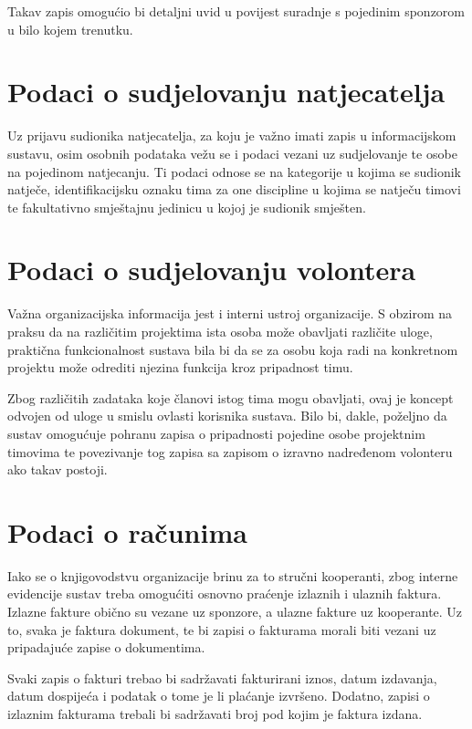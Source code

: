 \documentclass[times, utf8, diplomski]{fer}
\begin{document}
Takav zapis omogućio bi detaljni uvid u povijest suradnje s pojedinim sponzorom
u bilo kojem trenutku.

\section{Podaci o sudjelovanju natjecatelja}

Uz prijavu sudionika natjecatelja, za koju je važno imati zapis u informacijskom
sustavu, osim osobnih podataka vežu se i podaci vezani uz sudjelovanje te osobe
na pojedinom natjecanju. Ti podaci odnose se na kategorije u kojima se sudionik
natječe, identifikacijsku oznaku tima za one discipline u kojima se natječu
timovi te fakultativno smještajnu jedinicu u kojoj je sudionik smješten.

\section{Podaci o sudjelovanju volontera}

Važna organizacijska informacija jest i interni ustroj organizacije. S obzirom
na praksu da na različitim projektima ista osoba može obavljati različite uloge,
praktična funkcionalnost sustava bila bi da se za osobu koja radi na konkretnom
projektu može odrediti njezina funkcija kroz pripadnost timu.

Zbog različitih zadataka koje članovi istog tima mogu obavljati, ovaj je koncept
odvojen od uloge u smislu ovlasti korisnika sustava. Bilo bi, dakle, poželjno da
sustav omogućuje pohranu zapisa o pripadnosti pojedine osobe projektnim timovima
te povezivanje tog zapisa sa zapisom o izravno nadređenom volonteru ako takav
postoji.

\section{Podaci o računima}

Iako se o knjigovodstvu organizacije brinu za to stručni kooperanti, zbog
interne evidencije sustav treba omogućiti osnovno praćenje izlaznih i ulaznih
faktura. Izlazne fakture obično su vezane uz sponzore, a ulazne fakture uz
kooperante. Uz to, svaka je faktura dokument, te bi zapisi o fakturama morali
biti vezani uz pripadajuće zapise o dokumentima.

Svaki zapis o fakturi trebao bi sadržavati fakturirani iznos, datum izdavanja,
datum dospijeća i podatak o tome je li plaćanje izvršeno. Dodatno, zapisi o
izlaznim fakturama trebali bi sadržavati broj pod kojim je faktura izdana.
\end{document}
